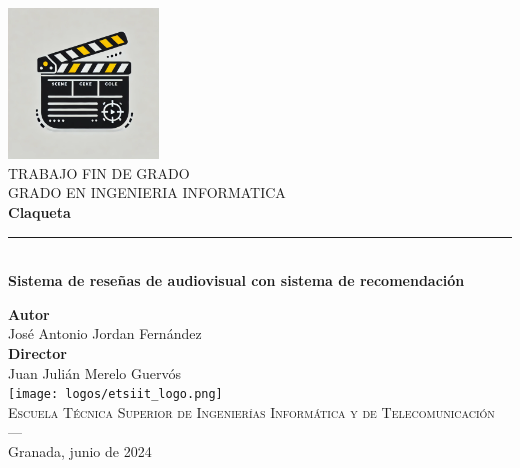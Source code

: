 \cleardoublepage


\begin{titlepage}

\setlength{\centeroffset}{-0.5\oddsidemargin}
\addtolength{\centeroffset}{0.5\evensidemargin}
\thispagestyle{empty}

\noindent\hspace*{\centeroffset}\begin{minipage}{\textwidth}

\centering
\includegraphics[width=0.3\textwidth]{logos/claqueta_logo.png}\\[1.cm]

\textsc{ \Large TRABAJO FIN DE GRADO\\[0.2cm]}
\textsc{ GRADO EN INGENIERIA INFORMATICA}\\[1cm]

{\Huge\bfseries Claqueta \\}
\noindent\rule[-1ex]{\textwidth}{3pt}\\[3.5ex]
{\large\bfseries Sistema de reseñas de
audiovisual con sistema de
recomendación }
\end{minipage}

\vspace{2.5cm}
\noindent\hspace*{\centeroffset}
\begin{minipage}{\textwidth}
\centering

\textbf{Autor}\\ {José Antonio Jordan Fernández}\\[2.5ex]
\textbf{Director}\\ {Juan Julián Merelo Guervós}\\[2cm]
\texttt{[image: logos/etsiit\_logo.png]}\\[0.1cm]
\textsc{Escuela Técnica Superior de Ingenierías Informática y de Telecomunicación}\\
\textsc{---}\\
Granada, junio de 2024
\end{minipage}
\end{titlepage}


